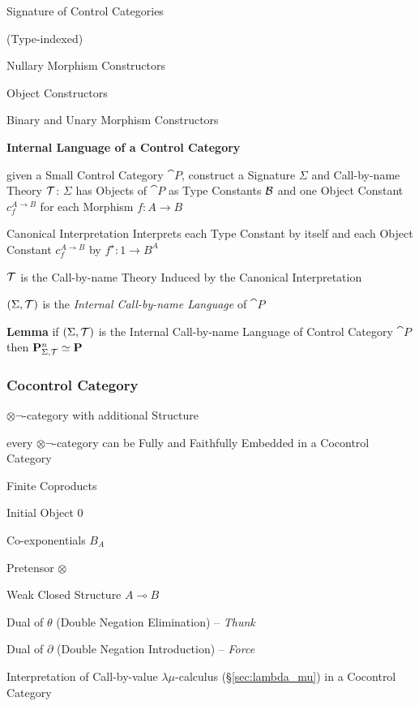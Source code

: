 Signature of Control Categories

(Type-indexed)

Nullary Morphism Constructors

Object Constructors

Binary and Unary Morphism Constructors



\textbf{Internal Language of a Control Category}

given a Small Control Category $\cat{P}$, construct a Signature
$\Sigma$ and Call-by-name Theory $\mathcal{T}$: $\Sigma$ has Objects of
$\cat{P}$ as Type Constants $\mathcal{B}$ and one Object Constant
$c_f^{A \rightarrow B}$ for each Morphism $f : A \rightarrow B$

Canonical Interpretation Interprets each Type Constant by
itself and each Object Constant $c_f^{A \rightarrow B}$ by $f^\star :
1 \rightarrow B^A$

$\mathcal{T}$ is the Call-by-name Theory Induced by the Canonical
Interpretation

$(\Sigma,\mathcal{T})$ is the \emph{Internal Call-by-name Language} of
$\cat{P}$

\textbf{Lemma} if $(\Sigma,\mathcal{T})$ is the Internal Call-by-name
Language of Control Category $\cat{P}$ then
$\mathbf{P}^n_{\Sigma,\mathcal{T}} \simeq \mathbf{P}$



\subsubsection{Cocontrol Category}\label{sec:cocontrol_category}

$\otimes\neg$-category with additional Structure %

every $\otimes\neg$-category can be Fully and Faithfully Embedded in a
Cocontrol Category

Finite Coproducts

Initial Object $0$

Co-exponentials $B_A$

Pretensor $\otimes$

Weak Closed Structure $A \multimap B$


Dual of $\theta$ (Double Negation Elimination) -- \emph{Thunk}

Dual of $\partial$ (Double Negation Introduction) -- \emph{Force}


\asterism


Interpretation of Call-by-value $\lambda\mu$-calculus
(\S\ref{sec:lambda_mu}) in a Cocontrol Category


